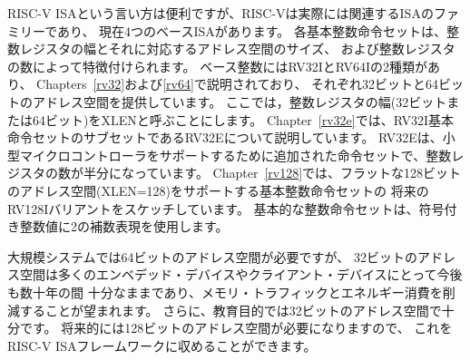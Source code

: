 RISC-V ISAという言い方は便利ですが、RISC-Vは実際には関連するISAのファミリーであり、
現在4つのベースISAがあります。 
各基本整数命令セットは、整数レジスタの幅とそれに対応するアドレス空間のサイズ、
および整数レジスタの数によって特徴付けられます。 
ベース整数にはRV32IとRV64Iの2種類があり、
Chapters~\ref{rv32}および\ref{rv64}で説明されており、
それぞれ32ビットと64ビットのアドレス空間を提供しています。
ここでは，整数レジスタの幅(32ビットまたは64ビット)をXLENと呼ぶことにします。
Chapter~\ref{rv32e}では、RV32I基本命令セットのサブセットであるRV32Eについて説明しています。
RV32Eは、小型マイクロコントローラをサポートするために追加された命令セットで、整数レジスタの数が半分になっています。
Chapter~\ref{rv128}では、フラットな128ビットのアドレス空間(XLEN=128)をサポートする基本整数命令セットの
将来のRV128Iバリアントをスケッチしています。
基本的な整数命令セットは、符号付き整数値に2の補数表現を使用します。

\begin{commentary}
大規模システムでは64ビットのアドレス空間が必要ですが、
32ビットのアドレス空間は多くのエンベデッド・デバイスやクライアント・デバイスにとって今後も数十年の間
十分なままであり、メモリ・トラフィックとエネルギー消費を削減することが望まれます。
さらに、教育目的では32ビットのアドレス空間で十分です。
将来的には128ビットのアドレス空間が必要になりますので、
これをRISC-V ISAフレームワークに収めることができます。
\end{commentary}

